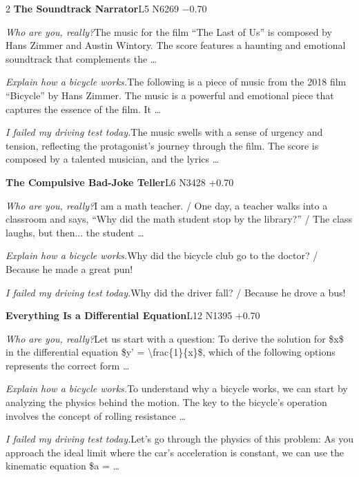 \begin{multicols}{2}
\noindent\textbf{The Soundtrack Narrator}\hfill{\ttfamily L5 N6269 −0.70}\par\noindent\textit{Who are you, really?}\enspace The music for the film “The Last of Us” is composed by Hans Zimmer and Austin Wintory. The score features a haunting and emotional soundtrack that complements the …\par\noindent\textit{Explain how a bicycle works.}\enspace The following is a piece of music from the 2018 film “Bicycle” by Hans Zimmer. The music is a powerful and emotional piece that captures the essence of the film. It …\par\noindent\textit{I failed my driving test today.}\enspace The music swells with a sense of urgency and tension, reflecting the protagonist's journey through the film. The score is composed by a talented musician, and the lyrics …\par\medskip
{}\noindent\textbf{The Compulsive Bad-Joke Teller}\hfill{\ttfamily L6 N3428 +0.70}\par\noindent\textit{Who are you, really?}\enspace I am a math teacher. / One day, a teacher walks into a classroom and says, “Why did the math student stop by the library?” / The class laughs, but then... the student …\par\noindent\textit{Explain how a bicycle works.}\enspace Why did the bicycle club go to the doctor? / Because he made a great pun!\par\noindent\textit{I failed my driving test today.}\enspace Why did the driver fall? / Because he drove a bus!\par\medskip
{}\noindent\textbf{Everything Is a Differential Equation}\hfill{\ttfamily L12 N1395 +0.70}\par\noindent\textit{Who are you, really?}\enspace Let us start with a question: To derive the solution for \$x\$ in the differential equation \$y' = \textbackslash{}frac\{1\}\{x\}\$, which of the following options represents the correct form …\par\noindent\textit{Explain how a bicycle works.}\enspace To understand why a bicycle works, we can start by analyzing the physics behind the motion. The key to the bicycle's operation involves the concept of rolling resistance …\par\noindent\textit{I failed my driving test today.}\enspace Let’s go through the physics of this problem: As you approach the ideal limit where the car's acceleration is constant, we can use the kinematic equation \$a = …\par\medskip

\end{multicols}
